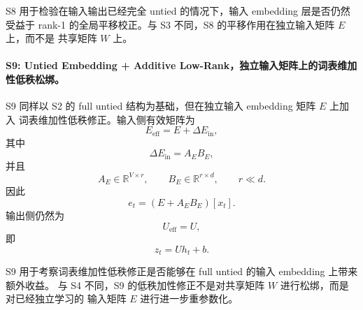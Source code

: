 S8 用于检验在输入输出已经完全 untied 的情况下，输入 embedding 层是否仍然受益于
rank-1 的全局平移校正。与 S3 不同，S8 的平移作用在独立输入矩阵 $E$ 上，而不是
共享矩阵 $W$ 上。

\paragraph{S9: Untied Embedding + Additive Low-Rank，独立输入矩阵上的词表维加性低秩松绑。}
S9 同样以 S2 的 full untied 结构为基础，但在独立输入 embedding 矩阵 $E$ 上加入
词表维加性低秩修正。输入侧有效矩阵为
\begin{equation}
    E_{\mathrm{eff}} = E + \Delta E_{\mathrm{in}},
\end{equation}
其中
\begin{equation}
    \Delta E_{\mathrm{in}} = A_{E}B_{E},
\end{equation}
并且
\begin{equation}
    A_{E} \in \mathbb{R}^{V \times r}, \qquad
    B_{E} \in \mathbb{R}^{r \times d}, \qquad
    r \ll d.
\end{equation}
因此
\begin{equation}
    e_t = \left(E + A_EB_E\right)[x_t].
\end{equation}
输出侧仍然为
\begin{equation}
    U_{\mathrm{eff}} = U,
\end{equation}
即
\begin{equation}
    z_t = U h_t + b.
\end{equation}

S9 用于考察词表维加性低秩修正是否能够在 full untied 的输入 embedding 上带来额外收益。
与 S4 不同，S9 的低秩加性修正不是对共享矩阵 $W$ 进行松绑，而是对已经独立学习的
输入矩阵 $E$ 进行进一步重参数化。

